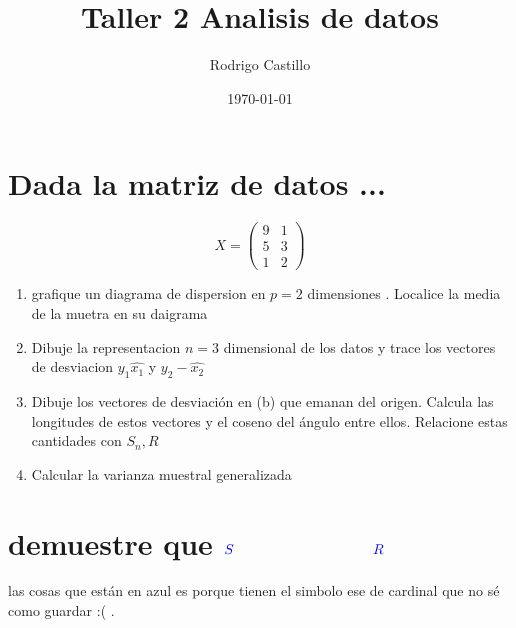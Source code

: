 \documentclass[10pt,a4paper]{article} %
\begin{document}
    \title{{  Taller 2 Analisis de datos  }}
    \author{{Rodrigo Castillo}}
    \date{\today}

    \maketitle


    \section{Dada la matriz de datos ... }
        \begin{equation}
            X = \begin{pmatrix}
               9 & 1
               \\ 5 & 3
               \\ 1 & 2
            \end{pmatrix}
        \end{equation}

        \begin{enumerate}

            \item {grafique un diagrama de dispersion en $ p = 2  $ dimensiones
                . Localice la media de la muetra en su daigrama}

            \item {Dibuje la representacion $ n = 3  $ dimensional de los datos
                y trace los vectores de desviacion  $ y_1  \hat{x_1  }   $ y $ y_2 - \hat{x_2}   $ }

            \item {Dibuje los vectores de desviación en (b) que emanan del origen. Calcula las
            longitudes de estos vectores y el coseno del ángulo entre ellos. Relacione estas
            cantidades con $ S_n , R  $ }
            \item {\color{red} Calcular la varianza muestral generalizada $ \color{white}  S  $ }
        \end{enumerate}

        \section{demuestre que $ \color{blue} S \color{white}  = (s_{11} ,
        s_{22} , s_{33} , ... , s_{pp})\color{blue} R \color{white}   $ }
        \color{yellow} las cosas que están en \color{blue} azul \color{white} es porque tienen
        el simbolo ese de cardinal que no sé como guardar :( .

 \color{white}
























    \nocite{*}
    
    
\end{document}
